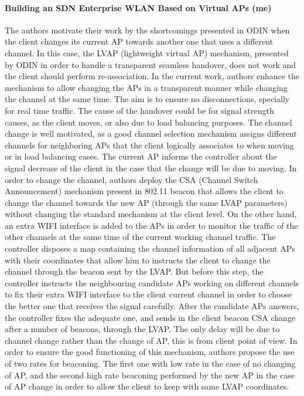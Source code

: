 \documentclass[journal,transmag]{IEEEtran}
\begin{document}
\paragraph{Building an SDN Enterprise WLAN Based on Virtual APs  \cite{17building_SDN_entreprise_virtual_AP} (me)}  
The authors motivate their work by the shortcomings presented in ODIN \cite{14Odin:Programmatic_Orchestration_WiFi} when the client changes its current AP towards another one that uses a different channel. In this case, the LVAP (lightweight virtual AP) mechanism, presented by ODIN in order to handle a transparent seamless handover, does not work and the client should perform re-association. In the current work, authors enhance the mechanism to allow changing the APs in a transparent manner while changing the channel at the same time. The aim is to ensure no disconnections, specially for real time traffic. The cause of the handover could be for signal strength causes, as the client moves, or also due to load balancing purposes. The channel change is well motivated, as a good channel selection mechanism assigns different channels for neighboring APs that the client logically associates to when moving or in load balancing cases. The current AP informs the controller about the signal decrease of the client in the case that the change will be due to moving. In order to change the channel, authors deploy the CSA (Channel Switch Announcement) mechanism present in 802.11 beacon that allows the client to change the channel towards the new AP (through the same LVAP parameters) without changing the standard mechanism at the client level. On the other hand, an extra WIFI interface is added to the APs in order to monitor the traffic of the other channels at the same time of the current working channel traffic. The controller disposes a map containing the channel information of all adjacent APs with their coordinates that allow him to instructs the client to change the channel through the beacon sent by the LVAP. But before this step, the controller instructs the neighbouring candidate APs working on different channels to fix their extra WIFI interface to the client current channel in order to choose the better one that receives the signal carefully. After the candidate APs answers, the controller fixes the adequate one, and sends in the client beacon CSA change after a number of beacons, through the LVAP. The only delay will be due to channel change rather than the change of AP, this is from client point of view. In order to ensure the good functioning of this mechanism, authors propose the use of two rates for beaconing. The first one with low rate in the case of no changing of AP, and the second high rate beaconing performed by the new AP in the case of AP change in order to allow the client to keep with same LVAP coordinates.     
\end{document}
